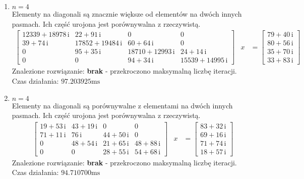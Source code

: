 \documentclass[12pt]{article}
\begin{document}
\begin{enumerate}[label=\textbf{Układ \arabic*}]
		\item
			$n = 4$\\
			Elementy na diagonali są znacznie większe od elementów na dwóch innych pasmach. Ich część urojona jest porównywalna z rzeczywistą.
			{\small
			\begin{align*}
				\left[
					\begin{array}{cccc} 12339 + 18978\, \mathrm{i} & 22 + 91\, \mathrm{i} & 0 & 0\\ 39 + 74\, \mathrm{i} & 17852 + 19484\, \mathrm{i} & 60 + 64\, \mathrm{i} & 0\\ 0 & 95 + 35\, \mathrm{i} & 18710 + 12993\, \mathrm{i} & 24 + 14\, \mathrm{i}\\ 0 & 0 & 94 + 34\, \mathrm{i} & 15539 + 14995\, \mathrm{i} \end{array}
				\right]
				&x
				&=
				\left[
					\begin{array}{c} 79 + 40\, \mathrm{i}\\ 80 + 56\, \mathrm{i}\\ 35 + 70\, \mathrm{i}\\ 33 + 83\, \mathrm{i} \end{array}
				\right]
			\end{align*}
			}%
			Znalezione rozwiązanie: \textbf{brak} - przekroczono maksymalną liczbę iteracji.\\
			Czas działania: $97.203925\text{ms}$
		
		\item
			$n = 4$\\
			Elementy na diagonali są porównywalne z elementami na dwóch innych pasmach. Ich część urojona jest porównywalna z rzeczywistą.
			\begin{align*}
				\left[
					\begin{array}{cccc} 19 + 53\, \mathrm{i} & 43 + 19\, \mathrm{i} & 0 & 0\\ 71 + 11\, \mathrm{i} & 76\, \mathrm{i} & 44 + 50\, \mathrm{i} & 0\\ 0 & 48 + 54\, \mathrm{i} & 21 + 65\, \mathrm{i} & 48 + 88\, \mathrm{i}\\ 0 & 0 & 28 + 55\, \mathrm{i} & 54 + 68\, \mathrm{i} \end{array}
				\right]
				&x
				&=
				\left[
					\begin{array}{c} 83 + 32\, \mathrm{i}\\ 69 + 16\, \mathrm{i}\\ 71 + 74\, \mathrm{i}\\ 18 + 57\, \mathrm{i} \end{array}
				\right]
			\end{align*}
			Znalezione rozwiązanie: \textbf{brak} - przekroczono maksymalną liczbę iteracji.\\
			Czas działania: $94.710700\text{ms}$
		

\end{enumerate}
\end{document}
